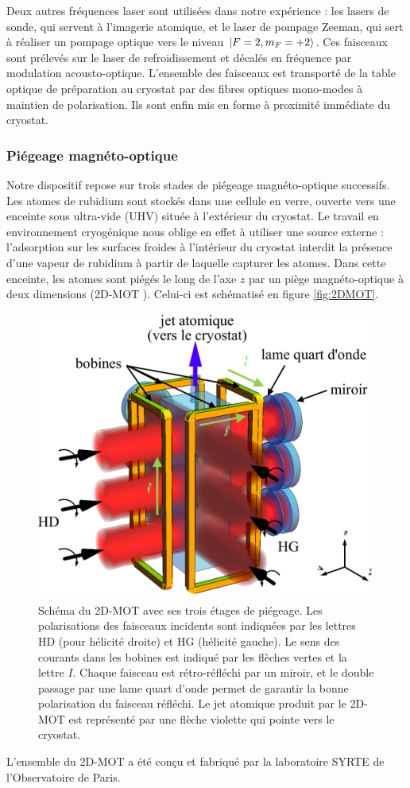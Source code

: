 Deux autres fréquences laser sont utilisées dans notre expérience : les lasers de sonde, qui servent à l'imagerie atomique, et le laser de pompage Zeeman, qui sert à réaliser un pompage optique vers le niveau $\ket{F=2,m_F=+2}$.
Ces faisceaux sont prélevés sur le laser de refroidissement et décalés en fréquence par modulation acousto-optique.
L'ensemble des faisceaux est transporté de la table optique de préparation au cryostat par des fibres optiques mono-modes à maintien de polarisation.
Ils sont enfin mis en forme à proximité immédiate du cryostat. 




	\subsubsection*{Piégeage magnéto-optique}
\noindent	Notre dispositif repose sur trois stades de piégeage magnéto-optique successifs.
Les atomes de rubidium sont stockés dans une cellule en verre, ouverte vers une enceinte sous ultra-vide (UHV) située à l'extérieur du cryostat.
Le travail en environnement cryogénique nous oblige en effet à utiliser une source externe : l'adsorption sur les surfaces froides à l'intérieur du cryostat interdit la présence d'une vapeur de rubidium à partir de laquelle capturer les atomes.
Dans cette enceinte, les atomes sont piégés le long de l'axe $z$ par un piège magnéto-optique à deux dimensions (\og 2D-MOT \fg{}).
Celui-ci est schématisé en figure \eqref{fig:2DMOT}.
%	
\begin{figure}[!h]
\centering
\includegraphics[width=0.6\linewidth]{figures/setup/coldatoms/2DMOT_2}
\caption[Schéma du 2D-MOT]{Schéma du 2D-MOT avec ses trois étages de piégeage.
Les polarisations des faisceaux incidents sont indiquées par les lettres HD (pour hélicité droite) et HG (hélicité gauche).%
Le sens des courants dans les bobines est indiqué par les flèches vertes et la lettre $I$.
Chaque faisceau est rétro-réfléchi par un miroir, et le double passage par une lame quart d'onde permet de garantir la bonne polarisation du faisceau réfléchi.
Le jet atomique produit par le 2D-MOT est représenté par une flèche violette qui pointe vers le cryostat.
}
\label{fig:2DMOT}
\end{figure}
%
L'ensemble du 2D-MOT a été conçu et fabriqué par la laboratoire SYRTE de l'Observatoire de Paris.

